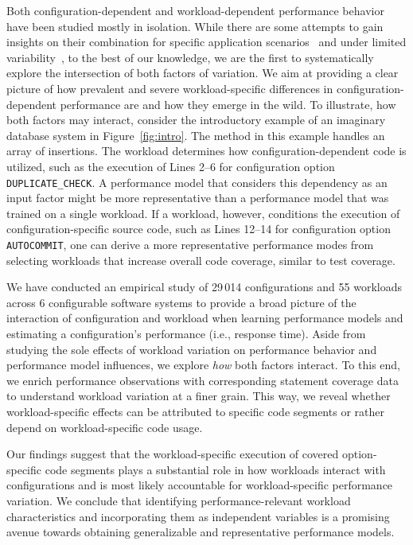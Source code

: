 Both configuration-dependent and workload-dependent performance behavior have been studied mostly in isolation. While there are some attempts to gain insights on their combination for specific application scenarios~\cite{alves_sampling_2020} and under limited variability~\cite{liao_2020_using_emse}, to the best of our knowledge, we are the first to systematically explore the intersection of both factors of variation. We aim at providing a clear picture of how prevalent and severe workload-specific differences in configuration-dependent performance are and how they emerge in the wild. 
To illustrate, how both factors may interact, consider the introductory example of an imaginary database system in Figure~\ref{fig:intro}. The method in this example handles an array of insertions. The workload determines how configuration-dependent code is utilized, such as the execution of \colorbox{duplicatecheck}{Lines 2--6} for configuration option \texttt{DUPLICATE\_CHECK}. A performance model that considers this dependency as an input factor might be more representative than a performance model that was trained on a single workload. If a workload, however, conditions the execution of configuration-specific source code, such as \colorbox{autocommit}{Lines 12--14} for configuration option \texttt{AUTOCOMMIT}, one can derive a more representative performance modes from selecting workloads that increase overall code coverage, similar to test coverage.

We have conducted an empirical study of 29\,014 configurations and 55 workloads across 6 configurable software systems to provide a broad picture of the interaction of configuration and workload when learning performance models and estimating a configuration's performance (i.e., response time). Aside from studying the sole effects of workload variation on performance behavior and performance model influences, we explore \emph{how} both factors interact. To this end, we enrich performance observations with corresponding statement coverage data to understand workload variation at a finer grain. This way, we reveal whether workload-specific effects can be attributed to specific code segments or rather depend on workload-specific code usage.

Our findings suggest that the workload-specific
execution of covered option-specific code segments plays a substantial role in how workloads interact with configurations and is most likely accountable for workload-specific performance variation. We conclude that identifying performance-relevant workload characteristics and incorporating them as independent variables is
a promising avenue towards obtaining generalizable and representative performance models.

